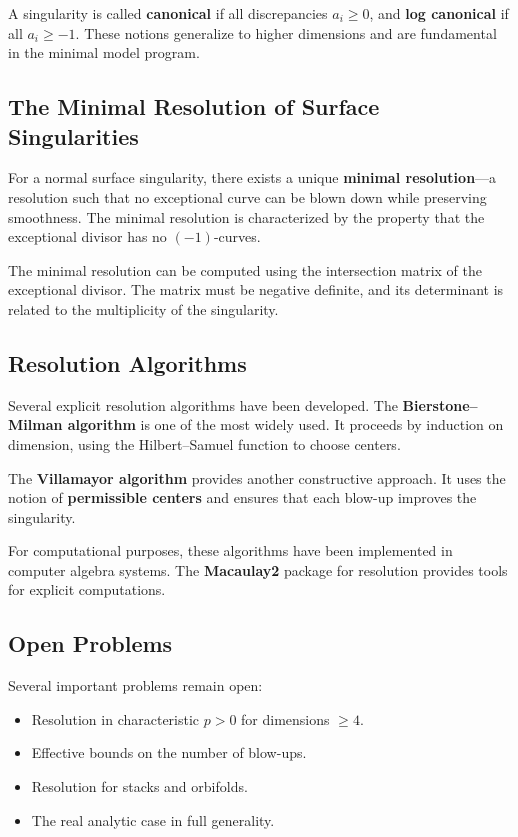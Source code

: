 A singularity is called \textbf{canonical} if all discrepancies $a_i \geq 0$, and \textbf{log canonical} if all $a_i \geq -1$. These notions generalize to higher dimensions and are fundamental in the minimal model program.

\subsection*{The Minimal Resolution of Surface Singularities}

For a normal surface singularity, there exists a unique \textbf{minimal resolution}---a resolution such that no exceptional curve can be blown down while preserving smoothness. The minimal resolution is characterized by the property that the exceptional divisor has no $(-1)$-curves.

The minimal resolution can be computed using the intersection matrix of the exceptional divisor. The matrix must be negative definite, and its determinant is related to the multiplicity of the singularity.

\subsection*{Resolution Algorithms}

Several explicit resolution algorithms have been developed. The \textbf{Bierstone--Milman algorithm} is one of the most widely used. It proceeds by induction on dimension, using the Hilbert--Samuel function to choose centers.

The \textbf{Villamayor algorithm} provides another constructive approach. It uses the notion of \textbf{permissible centers} and ensures that each blow-up improves the singularity.

For computational purposes, these algorithms have been implemented in computer algebra systems. The \textbf{Macaulay2} package for resolution provides tools for explicit computations.

\subsection*{Open Problems}

Several important problems remain open:

\begin{itemize}
\item Resolution in characteristic $p > 0$ for dimensions $\geq 4$.
\item Effective bounds on the number of blow-ups.
\item Resolution for stacks and orbifolds.
\item The real analytic case in full generality.
\end{itemize}

